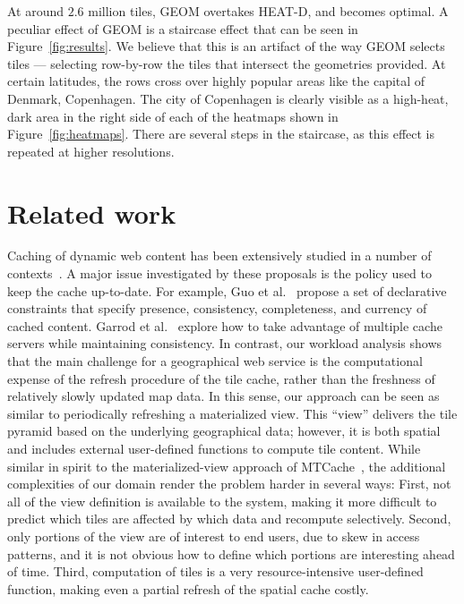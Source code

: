 \documentclass[11pt, oneside]{report}
\begin{document}
{At around $2.6$ million tiles, GEOM overtakes HEAT-D, and becomes optimal. A peculiar effect of GEOM is a staircase effect that can be seen in Figure~\ref{fig:results}. We believe that this is an artifact of the way GEOM selects tiles --- selecting row-by-row the tiles that intersect the geometries provided. At certain latitudes, the rows cross over highly popular areas like the capital of Denmark, Copenhagen. The city of Copenhagen is clearly visible as a high-heat, dark area in the right side of each of the heatmaps shown in Figure~\ref{fig:heatmaps}. There are several steps in the staircase, as this effect is repeated at higher resolutions.

\section{Related work}
\label{sec:tileheat:related:work}

Caching of dynamic web content has been extensively studied in a number of contexts~\cite{DDT+01:DynamicContentAcceleration,GMA+08:Ferdinand,GLR05:GoodEnough,LGZ04:MTCache,LKM+02:DBCache,Moh01:WebCaching}. A major issue investigated by these proposals is the policy used to keep the cache up-to-date. 
For example, Guo et al.~\cite{GLR05:GoodEnough} propose a set of declarative constraints that specify presence,  consistency, completeness, and currency of cached content. 
Garrod et al.~\cite{GMA+08:Ferdinand} explore how to take advantage of multiple cache servers while maintaining consistency. In contrast, our workload analysis shows that the main challenge for a geographical web service is the computational expense of the refresh procedure of the tile cache, rather than the freshness of relatively slowly updated map data. In this sense, our approach can be seen as similar to periodically refreshing a materialized view. This  ``view'' delivers the tile pyramid based on the underlying geographical data; however, it is both spatial and includes external user-defined functions to compute tile content. While similar in spirit to the materialized-view approach of MTCache~\cite{LGZ04:MTCache}, the additional complexities of our domain render the problem harder in several ways: First, not all of the view definition is available to the system, making it more difficult to predict which tiles are affected by which data and recompute selectively. Second, only portions of the view are of interest to end users, due to skew in access patterns, and it is not obvious how to define which portions are interesting ahead of time. Third, computation of tiles is a very resource-intensive user-defined function, making even a partial refresh of the spatial cache costly.  
 
}
\end{document}
